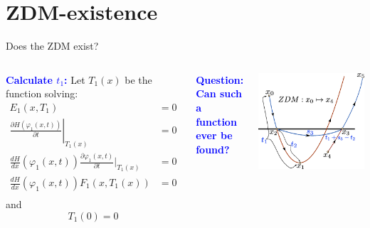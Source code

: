 \documentclass[xcolor=x11names,compress]{beamer}
\renewcommand{\(}{\begin{columns}}
\renewcommand{\)}{\end{columns}}
\newcommand{\<}[1]{\begin{column}{#1}}
\renewcommand{\>}{\end{column}}
\newcommand{\hlb}[1]{\textbf{\textcolor{blue}{#1}}}
\begin{document}
\section{ZDM-existence}
\begin{frame}{Does the ZDM exist?}
\begin{columns}[c]
\hlb{ Calculate $t_1$:}
Let $T_1(x)$ be the function solving:
\begin{align*}
E_1(x,T_1)&=0\\
\left.  \frac{\partial H(\varphi_1(x,t))}{\partial t}\right|_{T_1(x)}&=0\\
\frac{dH}{dx}(\varphi_1(x,t))\frac{\partial\varphi_1(x,t)}{\partial t}\left.  \right|_{T_1(x)}&=0\\
\frac{dH}{dx}(\varphi_1(x,t))F_1(x,T_1(x))&=0\\
\end{align*}
and 
\begin{equation}
\label{impl1}
T_1(0)=0
\end{equation}

\hlb{ Question: Can such a function ever be found?}



\begin{center}
\includegraphics[width=\textwidth]{ZDM}
\end{center}
\end{columns}
\end{frame}
\end{document}
